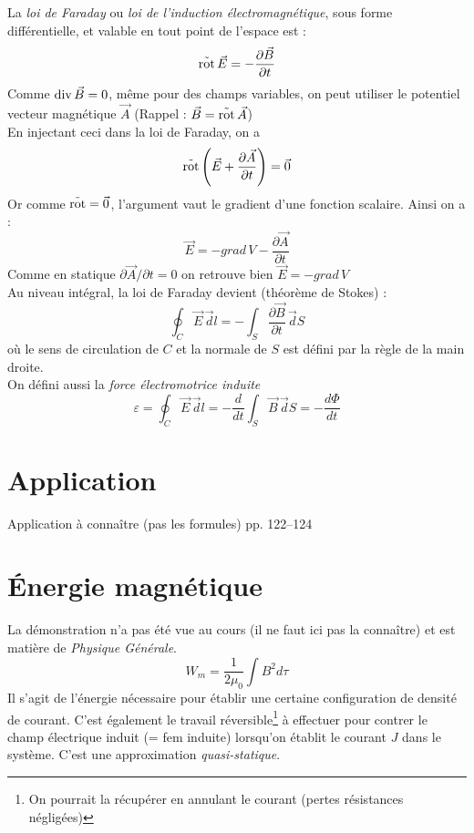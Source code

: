 \documentclass[british,french,11pt, a4paper, openany]{book}
\begin{document}
		La \textit{loi de Faraday} ou \textit{loi de l'induction électromagnétique}, sous forme différentielle, et valable en tout point de l'espace est : \begin{equation}
		\operatorname{\vec{rot}}\vec E=-\frac{\partial \vec B}{\partial t}
		\end{equation}
		Comme $\operatorname{div}\vec B=0$, même pour des champs variables, on peut utiliser le potentiel vecteur magnétique $\vec A$ (Rappel : $\vec B=\operatorname{\vec{rot}}\vec A$)\\
		En injectant ceci dans la loi de Faraday, on a \begin{equation}
		\operatorname{\vec{rot}}\left(\vec E+\frac{\partial \vec A}{\partial t}\right)=\vec{0}
		\end{equation}
		Or comme $\operatorname{\vec{rot}} =\vec{0}$, l'argument vaut le gradient d'une fonction scalaire. Ainsi on a : \begin{equation}
		\vec E=-grad\,V-\frac{\partial\vec A}{\partial t}
		\end{equation}
		Comme en statique $\partial\vec A/\partial t=0$ on retrouve bien $\vec E=-grad\,V$\\
		Au niveau intégral, la loi de Faraday devient (théorème de Stokes) : \begin{equation}
		\oint_C\vec E\,\vec dl=-\int_S\frac{\partial\vec B}{\partial t}\,\vec dS
		\end{equation}où le sens de circulation de $C$ et la normale de $S$ est défini par la règle de la main droite.\\
		On défini aussi la \textit{force électromotrice induite}\begin{equation}
		\varepsilon=\oint_C\vec E\,\vec dl=-\frac{d}{dt}\int_S\vec B\,\vec dS=-\frac{d\Phi}{dt}
		\end{equation}
		\setcounter{section}{2}
		\section{Application}
		Application à connaître (pas les formules) pp. 122--124
		\section{Énergie magnétique}
		La démonstration n'a pas été vue au cours (il ne faut ici pas la connaître) et est matière de \textit{Physique Générale}.
		\begin{equation}
		W_m = \frac{1}{2\mu_0}\int B^2 d\tau
		\end{equation}
		Il s'agit de l'énergie nécessaire pour établir une certaine configuration de densité de courant. C'est également le travail réversible\footnote{On pourrait la récupérer en annulant le courant (pertes résistances négligées)} à effectuer pour contrer le champ électrique induit (= fem induite) lorsqu'on établit le courant $J$ dans le système. C'est une approximation \textit{quasi-statique}.
		
\end{document}
